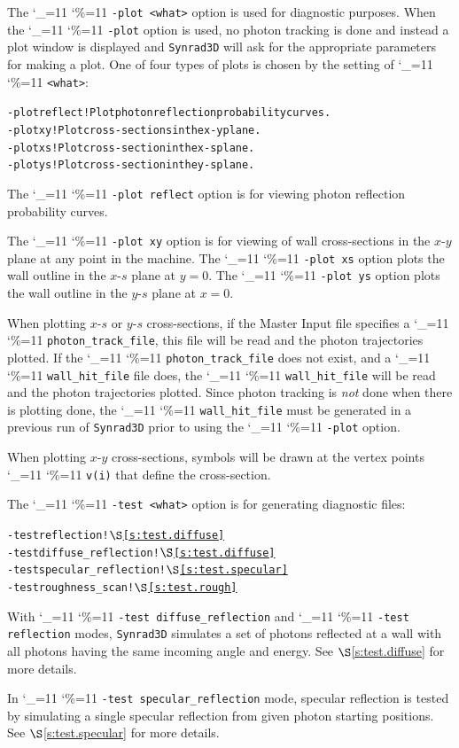 \documentclass[11pt,openany]{report}
\newcommand{\sref}[1]{$\S$\ref{#1}}
\newcommand{\srthree}{\texttt{Synrad3D}\xspace}
\newcommand\ttcmd{\begingroup\catcode`\_=11 \catcode`\%=11 \dottcmd}
\newcommand\dottcmd[1]{\texttt{#1}\endgroup}
\newcommand{\vn}{\ttcmd}
\newlength{\ExBeg}
\newlength{\ExEnd}
\newenvironment{example}
  {\vspace{\ExBeg} \begin{alltt}}
  {\end{alltt} \vspace{\ExEnd}}
\begin{document}
The \vn{-plot <what>} option is used for diagnostic purposes. When the
\vn{-plot} option is used, no photon tracking is done and instead a
plot window is displayed and \srthree will ask for the appropriate
parameters for making a plot. One of four types of plots is chosen by
the setting of \vn{<what>}:
\begin{example}
  -plot reflect ! Plot photon reflection probability curves.
  -plot xy      ! Plot cross-sections in the x-y plane.
  -plot xs      ! Plot cross-section in the x-s plane.
  -plot ys      ! Plot cross-section in the y-s plane.
\end{example}

The \vn{-plot reflect} option is for viewing photon reflection
probability curves. 

The \vn{-plot xy} option is for viewing of wall
cross-sections in the $x$-$y$ plane at any point in the machine. The
\vn{-plot xs} option plots the wall outline in the $x$-$s$ plane at $y
= 0$. The \vn{-plot ys} option plots the wall outline in the $y$-$s$
plane at $x = 0$. 

When plotting $x$-$s$ or $y$-$s$ cross-sections, if the Master Input file specifies a
\vn{photon_track_file}, this file will be read and the photon trajectories plotted.  If
the \vn{photon_track_file} does not exist, and a \vn{wall_hit_file} file does, the
\vn{wall_hit_file} will be read and the photon trajectories plotted. Since photon tracking
is {\em not} done when there is plotting done, the \vn{wall_hit_file} must be generated in
a previous run of \srthree prior to using the \vn{-plot} option.

When plotting $x$-$y$ cross-sections, symbols
will be drawn at the vertex points \vn{v(i)} that define the
cross-section.

The \vn{-test <what>} option is for generating diagnostic
files:
\begin{example}
  -test reflection             ! \sref{s:test.diffuse}
  -test diffuse_reflection     ! \sref{s:test.diffuse}
  -test specular_reflection    ! \sref{s:test.specular}
  -test roughness_scan         ! \sref{s:test.rough}
\end{example}

With \vn{-test diffuse_reflection} and \vn{-test reflection} modes, \srthree simulates a set of
photons reflected at a wall with all photons having the same incoming angle and energy. See
\sref{s:test.diffuse} for more details.

In \vn{-test specular_reflection} mode, specular reflection is tested by simulating a single
specular reflection from given photon starting positions. See \sref{s:test.specular} for more
details.
\end{document}
